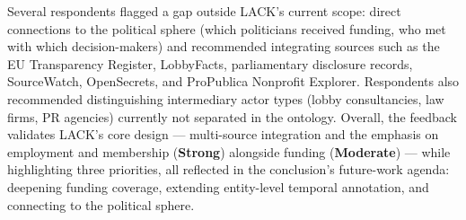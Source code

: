 Several respondents flagged a gap outside LACK's current scope: direct connections to the political sphere (which politicians received funding, who met with which decision-makers) and recommended integrating sources such as the EU Transparency Register, LobbyFacts, parliamentary disclosure records, SourceWatch, OpenSecrets, and ProPublica Nonprofit Explorer.
Respondents also recommended distinguishing intermediary actor types (lobby consultancies, law firms, PR agencies) currently not separated in the ontology. 
Overall, the feedback validates LACK's core design --- multi-source integration and the emphasis on employment and membership (\textbf{Strong}) alongside funding (\textbf{Moderate}) --- while highlighting three priorities, all reflected in the conclusion's future-work agenda: deepening funding coverage, extending entity-level temporal annotation, and connecting to the political sphere.
